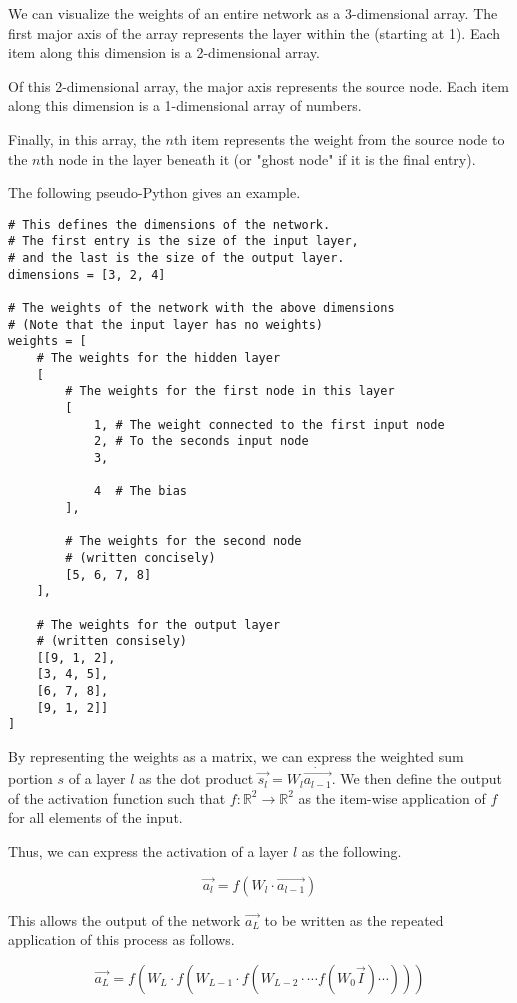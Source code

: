 \documentclass[8pt]{amsart}
\begin{document}
We can visualize the weights of an entire network as a 3-dimensional array. The first
major axis of the array represents the layer within the  (starting at 1). Each item
along this dimension is a 2-dimensional array.

Of this 2-dimensional array, the major axis represents the source node. Each item
along this dimension is a 1-dimensional array of numbers.

Finally, in this array, the $n$th item represents the weight from the source node
to the $n$th node in the layer beneath it (or "ghost node" if it is the final entry).

The following pseudo-Python gives an example.

\begin{verbatim}
# This defines the dimensions of the network.
# The first entry is the size of the input layer,
# and the last is the size of the output layer.
dimensions = [3, 2, 4]

# The weights of the network with the above dimensions
# (Note that the input layer has no weights)
weights = [
    # The weights for the hidden layer
    [
        # The weights for the first node in this layer
        [
            1, # The weight connected to the first input node
            2, # To the seconds input node
            3,
            
            4  # The bias
        ],

        # The weights for the second node
        # (written concisely)
        [5, 6, 7, 8]
    ],

    # The weights for the output layer
    # (written consisely)
    [[9, 1, 2],
    [3, 4, 5],
    [6, 7, 8],
    [9, 1, 2]]
]
\end{verbatim}

By representing the weights as a matrix, we can express the weighted sum portion $s$
of a layer $l$ as the dot product $\vec{s_l} = W_l \dot \vec{a_{l - 1}}$. We then
define the output of the activation function such that
$f: \mathbb{R}^2 \to \mathbb{R}^2$ as the item-wise application of $f$ for
all elements of the input.

Thus, we can express the activation of a layer $l$ as the following.

\[
    \vec{a_l} = f(W_l \cdot \vec{a_{l - 1}})
\]

This allows the output of the network $\vec{a_L}$ to be written as the repeated
application of this process as follows.

\[
    \vec{a_L} = f \left( 
        W_L \cdot f \left(
            W_{L - 1} \cdot f \left( 
                W_{L - 2} \cdot \cdots
                    f \left( W_0 \vec{I}
                \right) \cdots 
            \right)
        \right)
    \right)
\]
\end{document}
